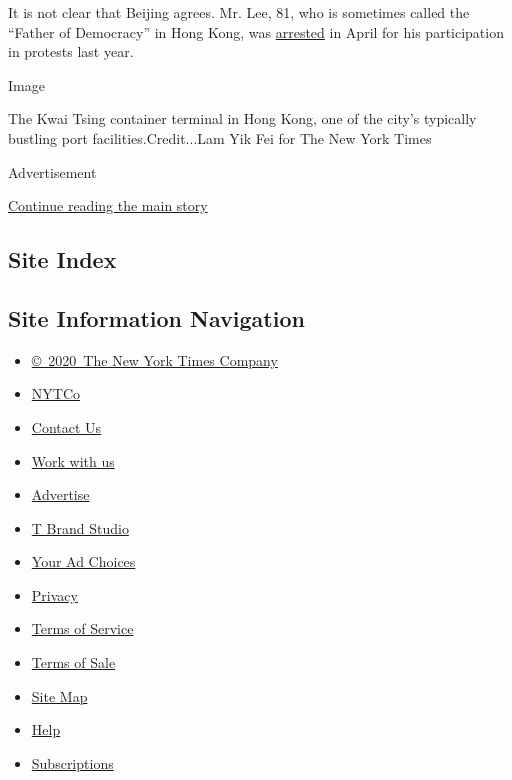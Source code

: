 It is not clear that Beijing agrees. Mr. Lee, 81, who is sometimes
called the ``Father of Democracy'' in Hong Kong, was
\href{https://www.nytimes3xbfgragh.onion/2020/04/18/world/asia/hong-kong-arrests.html}{arrested}
in April for his participation in protests last year.

Image

The Kwai Tsing container terminal in Hong Kong, one of the city's
typically bustling port facilities.Credit...Lam Yik Fei for The New York
Times

Advertisement

\protect\hyperlink{after-bottom}{Continue reading the main story}

\hypertarget{site-index}{%
\subsection{Site Index}\label{site-index}}

\hypertarget{site-information-navigation}{%
\subsection{Site Information
Navigation}\label{site-information-navigation}}

\begin{itemize}
\tightlist
\item
  \href{https://help.nytimes3xbfgragh.onion/hc/en-us/articles/115014792127-Copyright-notice}{©~2020~The
  New York Times Company}
\end{itemize}

\begin{itemize}
\tightlist
\item
  \href{https://www.nytco.com/}{NYTCo}
\item
  \href{https://help.nytimes3xbfgragh.onion/hc/en-us/articles/115015385887-Contact-Us}{Contact
  Us}
\item
  \href{https://www.nytco.com/careers/}{Work with us}
\item
  \href{https://nytmediakit.com/}{Advertise}
\item
  \href{http://www.tbrandstudio.com/}{T Brand Studio}
\item
  \href{https://www.nytimes3xbfgragh.onion/privacy/cookie-policy\#how-do-i-manage-trackers}{Your
  Ad Choices}
\item
  \href{https://www.nytimes3xbfgragh.onion/privacy}{Privacy}
\item
  \href{https://help.nytimes3xbfgragh.onion/hc/en-us/articles/115014893428-Terms-of-service}{Terms
  of Service}
\item
  \href{https://help.nytimes3xbfgragh.onion/hc/en-us/articles/115014893968-Terms-of-sale}{Terms
  of Sale}
\item
  \href{https://spiderbites.nytimes3xbfgragh.onion}{Site Map}
\item
  \href{https://help.nytimes3xbfgragh.onion/hc/en-us}{Help}
\item
  \href{https://www.nytimes3xbfgragh.onion/subscription?campaignId=37WXW}{Subscriptions}
\end{itemize}
